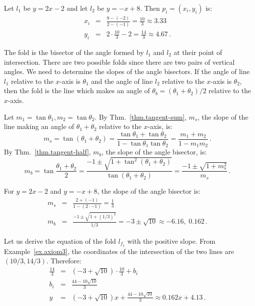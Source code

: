 \begin{example}\label{ex.axiom3}
Let $l_1$ be $y=2x-2$ and let $l_2$ be $y=-x+8$. Then $p_i=(x_i,y_i)$ is:
\begin{eqnarray*}
x_i&=&\frac{8-(-2)}{2-(-1)}=\frac{10}{3}\approx 3.33\\
y_i &=& 2\cdot\frac{10}{3}-2=\frac{14}{3}\approx 4.67\,.
\end{eqnarray*}
\end{example}

The fold is the bisector of the angle formed by $l_1$ and $l_2$ at their point of intersection. There are two possible folds since there are two pairs of vertical angles. We need to determine the slopes of the angle bisectors. If the angle of line $l_1$ relative to the $x$-axis is $\theta_1$ and the angle of line $l_2$ relative to the $x$-axis is $\theta_2$, then the fold is the line which makes an angle of $\theta_b=(\theta_1+\theta_2)/2$ relative to the $x$-axis.

Let $m_1=\tan\theta_1, m_2=\tan \theta_2$. By Thm.~\ref{thm.tangent-sum}, $m_s$, the slope of the line making an angle of $\theta_1+\theta_2$ relative to the $x$-axis, is:
\[
m_s=\tan(\theta_1+\theta_2)= \frac{\tan\theta_1+\tan\theta_2}{1-\tan\theta_1\tan\theta_2}=\frac{m_1+m_2}{1-m_1m_2}\,.
\]
By Thm.~\ref{thm.tangent-half}, $m_b$, the slope of the angle bisector, is:
\[
m_b= \tan\frac{\theta_1+\theta_2}{2}=\frac{-1\pm\sqrt{1+\tan^2(\theta_1+\theta_2)}}{\tan (\theta_1+\theta_2)}=\frac{-1\pm\sqrt{1+m_s^2}}{m_s}\,.
\]
\begin{example}
For $y=2x-2$ and $y=-x+8$, the slope of the angle bisector is:
%
\begin{eqnarray*}
m_s&=&\frac{2+(-1)}{1-(2 \cdot -1)}=\frac{1}{3}\\
m_b&=&\frac{-1\pm\sqrt{1+(1/3)^2}}{1/3}=-3\pm \sqrt{10}\approx -6.16,\; 0.162\,.
\end{eqnarray*}
\end{example}

Let us derive the equation of the fold $l_{f_1}$ with the positive slope. From Example~\ref{ex.axiom3}, the coordinates of the intersection of the two lines are $(10/3, 14/3)$. Therefore:
\begin{eqnarray*}
\frac{14}{3} &=& (-3+\sqrt{10}) \cdot \frac{10}{3} + b_i\\ b_i&=&\frac{44-10\sqrt{10}}{3}\\
y&=& (-3+\sqrt{10})x + \frac{44-10\sqrt{10}}{3}\approx 0.162x+4.13\,.
\end{eqnarray*}

